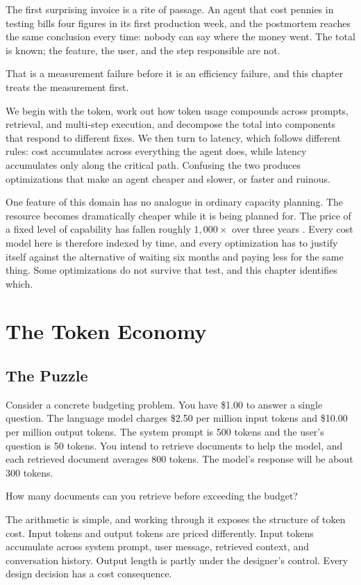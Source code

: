 \documentclass[11pt]{book}
\begin{document}
The first surprising invoice is a rite of passage. An agent that cost pennies in testing bills four figures in its first production week, and the postmortem reaches the same conclusion every time: nobody can say where the money went. The total is known; the feature, the user, and the step responsible are not.

That is a measurement failure before it is an efficiency failure, and this chapter treats the measurement first.

We begin with the token, work out how token usage compounds across prompts, retrieval, and multi-step execution, and decompose the total into components that respond to different fixes. We then turn to latency, which follows different rules: cost accumulates across everything the agent does, while latency accumulates only along the critical path. Confusing the two produces optimizations that make an agent cheaper and slower, or faster and ruinous.

One feature of this domain has no analogue in ordinary capacity planning. The resource becomes dramatically cheaper while it is being planned for. The price of a fixed level of capability has fallen roughly $1{,}000\times$ over three years \cite{llmflation2024}. Every cost model here is therefore indexed by time, and every optimization has to justify itself against the alternative of waiting six months and paying less for the same thing. Some optimizations do not survive that test, and this chapter identifies which.

\section{The Token Economy}

\subsection{The Puzzle}

Consider a concrete budgeting problem. You have \$1.00 to answer a single question. The language model charges \$2.50 per million input tokens and \$10.00 per million output tokens. The system prompt is 500 tokens and the user's question is 50 tokens. You intend to retrieve documents to help the model, and each retrieved document averages 800 tokens. The model's response will be about 300 tokens.

How many documents can you retrieve before exceeding the budget?

The arithmetic is simple, and working through it exposes the structure of token cost. Input tokens and output tokens are priced differently. Input tokens accumulate across system prompt, user message, retrieved context, and conversation history. Output length is partly under the designer's control. Every design decision has a cost consequence.
\end{document}
